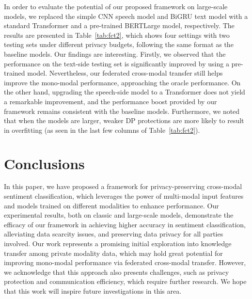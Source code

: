 \documentclass[11pt]{article}
\begin{document}
In order to evaluate the potential of our proposed framework on large-scale models, we replaced the simple CNN speech model and BiGRU text model with a standard Transformer and a pre-trained BERTLarge model, respectively. The results are presented in Table~\ref{tab:fct2}, which shows four settings with two testing sets under different privacy budgets, following the same format as the baseline models. Our findings are interesting. Firstly, we observed that the performance on the text-side testing set is significantly improved by using a pre-trained model. Nevertheless, our federated cross-modal transfer still helps improve the mono-modal performance, approaching the oracle performance. On the other hand, upgrading the speech-side model to a Transformer does not yield a remarkable improvement, and the performance boost provided by our framework remains consistent with the baseline models. Furthermore, we noted that when the models are larger, weaker DP protections are more likely to result in overfitting (as seen in the last few columns of Table~\ref{tab:fct2}).

 



\section{Conclusions}
In this paper, we have proposed a framework for privacy-preserving cross-modal sentiment classification, which leverages the power of multi-modal input features and models trained on different modalities to enhance performance. Our experimental results, both on classic and large-scale models, demonstrate the efficacy of our framework in achieving higher accuracy in sentiment classification, alleviating data scarcity issues, and preserving data privacy for all parties involved. Our work represents a promising initial exploration into knowledge transfer among private modality data, which may hold great potential for improving mono-modal performance via federated cross-modal transfer. However, we acknowledge that this approach also presents challenges, such as privacy protection and communication efficiency, which require further research. We hope that this work will inspire future investigations in this area.



\end{document}
